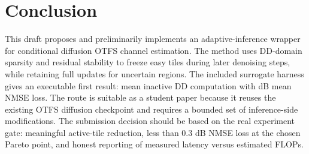 \documentclass[10pt,journal]{IEEEtran}
\begin{document}
\section{Conclusion}

This draft proposes and preliminarily implements an adaptive-inference wrapper
for conditional diffusion OTFS channel estimation. The method uses DD-domain
sparsity and residual stability to freeze easy tiles during later denoising
steps, while retaining full updates for uncertain regions. The included
surrogate harness gives an executable first result: \PrelimMeanInactive{} mean
inactive DD computation with \PrelimMeanLoss{} dB mean NMSE loss. The route is
suitable as a student paper because it reuses the existing OTFS diffusion
checkpoint and requires a bounded set of inference-side modifications. The
submission decision should be based on the real experiment gate: meaningful
active-tile reduction, less than 0.3 dB NMSE loss at the chosen Pareto point,
and honest reporting of measured latency versus estimated FLOPs.



\end{document}
